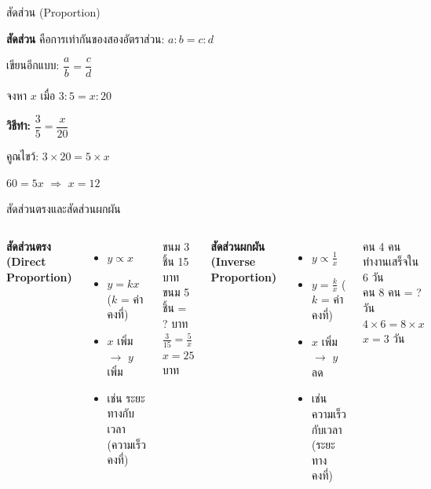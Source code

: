 \documentclass[11pt, aspectratio=169]{beamer}
\begin{document}
\begin{frame}{สัดส่วน (Proportion)}
  \begin{explanation}[นิยาม]
    \textbf{สัดส่วน} คือการเท่ากันของสองอัตราส่วน: \quad $a : b = c : d$

    \medskip
    เขียนอีกแบบ: $\dfrac{a}{b} = \dfrac{c}{d}$
  \end{explanation}

  \begin{exambox}
    จงหา $x$ เมื่อ $3 : 5 = x : 20$

    \medskip
    \textbf{วิธีทำ:} $\dfrac{3}{5} = \dfrac{x}{20}$

    คูณไขว้: $3 \times 20 = 5 \times x$

    $60 = 5x$ \quad $\Rightarrow$ \quad $x = 12$
  \end{exambox}
\end{frame}

\begin{frame}{สัดส่วนตรงและสัดส่วนผกผัน}
  \begin{columns}[T]
      \textbf{สัดส่วนตรง (Direct Proportion)}
      \begin{itemize}
        \item $y \propto x$
        \item $y = kx$ ($k$ = ค่าคงที่)
        \item $x$ เพิ่ม $\rightarrow$ $y$ เพิ่ม
        \item เช่น ระยะทางกับเวลา (ความเร็วคงที่)
      \end{itemize}

      \begin{exambox}[ตัวอย่าง]
        ขนม 3 ชิ้น 15 บาท \\
        ขนม 5 ชิ้น = ? บาท \\[0.3em]
        $\frac{3}{15} = \frac{5}{x}$ \\
        $x = 25$ บาท
      \end{exambox}

      \textbf{สัดส่วนผกผัน (Inverse Proportion)}
      \begin{itemize}
        \item $y \propto \frac{1}{x}$
        \item $y = \frac{k}{x}$ ($k$ = ค่าคงที่)
        \item $x$ เพิ่ม $\rightarrow$ $y$ ลด
        \item เช่น ความเร็วกับเวลา (ระยะทางคงที่)
      \end{itemize}

      \begin{exambox}[ตัวอย่าง]
        คน 4 คน ทำงานเสร็จใน 6 วัน \\
        คน 8 คน = ? วัน \\[0.3em]
        $4 \times 6 = 8 \times x$ \\
        $x = 3$ วัน
      \end{exambox}
  \end{columns}
\end{frame}
\end{document}
